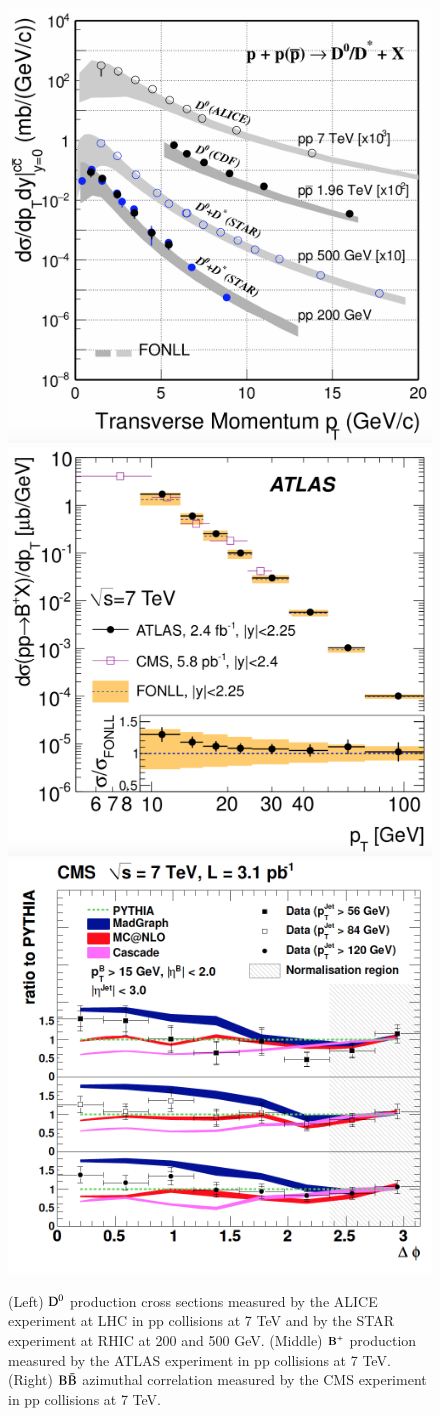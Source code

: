 \documentclass{webofc}
\begin{document}
\begin{figure}[ht]
\centering
\includegraphics[width=.32\textwidth]{Plots/Dcross_sectionLHCRHIC}
\includegraphics[width=.32\textwidth]{Plots/BplusATLASpp}
\includegraphics[width=.32\textwidth]{Plots/BBbarCMS7TeV}
\caption{(Left) $\rm D^{0}$ production cross sections measured by the ALICE experiment at LHC in pp collisions at 7 TeV and by the STAR experiment at RHIC at 200 and 500 GeV. 
(Middle) $\rm B^{+}$ production measured by the ATLAS experiment in pp collisions at 7 TeV. (Right) $\rm B \bar{B}$ azimuthal correlation measured by the CMS experiment in pp collisions at 7 TeV.}
\label{fig:ppresults}     
\end{figure}
\end{document}
